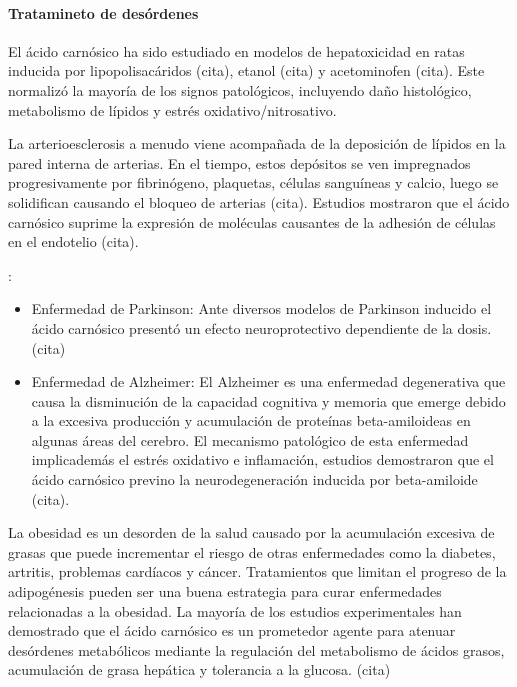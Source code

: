 \documentclass[11pt,a4paper]{article}
\begin{document}
\paragraph{Tratamineto de desórdenes}

\begin{description}[
			labelindent=5cm,
			labelsep=0.5cm,
			itemindent=2cm]

	\item[Daños de hígado] El ácido carnósico ha sido estudiado en modelos de hepatoxicidad en ratas inducida por lipopolisacáridos (cita), etanol (cita) y acetominofen (cita). Este normalizó la mayoría de los signos patológicos, incluyendo daño histológico, metabolismo de lípidos y estrés oxidativo/nitrosativo.

	\item[Arterioesclerosis] La arterioesclerosis a menudo viene acompañada de la deposición de lípidos en la pared interna de arterias. En el tiempo, estos depósitos se ven impregnados progresivamente por fibrinógeno, plaquetas, células sanguíneas y calcio, luego se solidifican causando el bloqueo de arterias (cita). Estudios mostraron que el ácido carnósico suprime la expresión de moléculas causantes de la adhesión de células en el endotelio (cita).

	\item[Daños cerebrales] : 
		\begin{itemize}
			\item Enfermedad de Parkinson: Ante diversos modelos de Parkinson inducido el ácido carnósico presentó un efecto neuroprotectivo dependiente de la dosis. (cita)
			\item Enfermedad de Alzheimer: El Alzheimer es una enfermedad degenerativa que causa la disminución de la capacidad cognitiva y memoria que emerge debido a la excesiva producción y acumulación de proteínas beta-amiloideas en algunas áreas del cerebro.
				El mecanismo patológico de esta enfermedad implicademás el estrés oxidativo e inflamación, estudios demostraron que el ácido carnósico previno la neurodegeneración inducida por beta-amiloide (cita).
		\end{itemize}
	\item[Obesidad] La obesidad es un desorden de la salud causado por la acumulación excesiva de grasas que puede incrementar el riesgo de otras enfermedades como la diabetes, artritis, problemas cardíacos y cáncer. Tratamientos que limitan el progreso de la adipogénesis pueden ser una buena estrategia para curar enfermedades relacionadas a la obesidad. La mayoría de los estudios experimentales han demostrado que el ácido carnósico es un prometedor agente para atenuar desórdenes metabólicos mediante la regulación del metabolismo de ácidos grasos, acumulación de grasa hepática y tolerancia a la glucosa. (cita)
	
\end{description}
\end{document}
